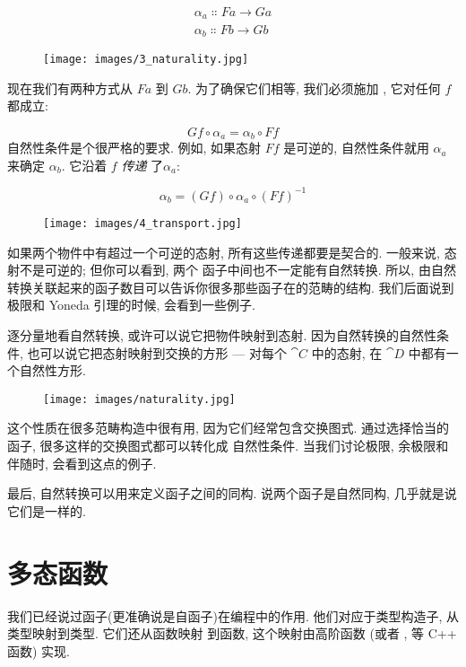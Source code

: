 \begin{gather*}
  \alpha_a \Colon F a \to G a \\
  \alpha_b \Colon F b \to G b
\end{gather*}

\begin{figure}[H]
  \centering
  \texttt{[image: images/3\_naturality.jpg]}
\end{figure}

\noindent
现在我们有两种方式从 $F a$ 到 $G b$. 为了确保它们相等, 我们必须施加
, 它对任何 $f$ 都成立:

\[G f \circ \alpha_a = \alpha_b \circ F f\]
自然性条件是个很严格的要求. 例如, 如果态射 $F f$ 是可逆的, 自然性条件就用 $\alpha_a$ 来确定 $\alpha_b$.
它沿着 $f$ \emph{传递} 了$\alpha_a$:

\[\alpha_b = (G f) \circ \alpha_a \circ (F f)^{-1}\]

\begin{figure}[H]
  \centering
  \texttt{[image: images/4\_transport.jpg]}
\end{figure}

\noindent
如果两个物件中有超过一个可逆的态射, 所有这些传递都要是契合的. 一般来说, 态射不是可逆的; 但你可以看到, 两个
函子中间也不一定能有自然转换. 所以, 由自然转换关联起来的函子数目可以告诉你很多那些函子在的范畴的结构.
我们后面说到极限和 Yoneda 引理的时候, 会看到一些例子.

逐分量地看自然转换, 或许可以说它把物件映射到态射. 因为自然转换的自然性条件, 也可以说它把态射映射到交换的方形
--- 对每个 $\cat{C}$ 中的态射, 在 $\cat{D}$ 中都有一个自然性方形.

\begin{figure}[H]
  \centering
  \texttt{[image: images/naturality.jpg]}
\end{figure}

\noindent
这个性质在很多范畴构造中很有用, 因为它们经常包含交换图式. 通过选择恰当的函子, 很多这样的交换图式都可以转化成
自然性条件. 当我们讨论极限, 余极限和伴随时, 会看到这点的例子.

最后, 自然转换可以用来定义函子之间的同构. 说两个函子是自然同构, 几乎就是说它们是一样的.

\section{多态函数}

我们已经说过函子(更准确说是自函子)在编程中的作用. 他们对应于类型构造子, 从类型映射到类型. 它们还从函数映射
到函数, 这个映射由高阶函数  (或者 ,  等 C++ 函数) 实现.


